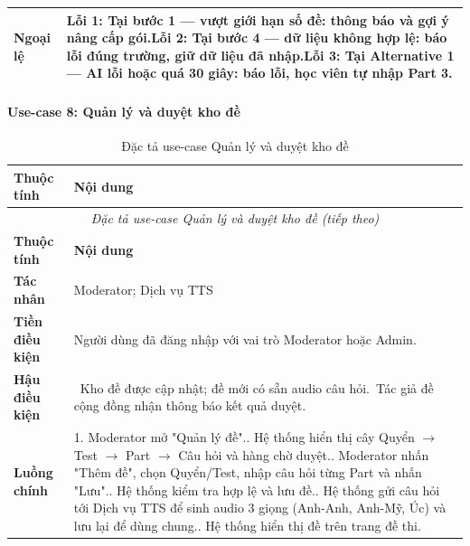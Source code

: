 \begin{longtable}{|p{3.2cm}|p{\dimexpr\linewidth-3.2cm-4\tabcolsep-3\arrayrulewidth\relax}|}
\textbf{Ngoại lệ} & \textbf{Lỗi 1:} Tại bước 1 --- vượt giới hạn số đề: thông báo và gợi ý nâng cấp gói.\newline \textbf{Lỗi 2:} Tại bước 4 --- dữ liệu không hợp lệ: báo lỗi đúng trường, giữ dữ liệu đã nhập.\newline \textbf{Lỗi 3:} Tại Alternative 1 --- AI lỗi hoặc quá 30 giây: báo lỗi, học viên tự nhập Part 3. \\ \hline
\end{longtable}
\endgroup


\paragraph{Use-case 8: Quản lý và duyệt kho đề}

\begingroup
\small
\renewcommand{\arraystretch}{1.15}
\begin{longtable}{|p{3.2cm}|p{\dimexpr\linewidth-3.2cm-4\tabcolsep-3\arrayrulewidth\relax}|}
\caption{Đặc tả use-case Quản lý và duyệt kho đề}\label{wispace:tab:wispace_uc08_moderate_tests}\\
\hline
\textbf{Thuộc tính} & \textbf{Nội dung} \\ \hline
\endfirsthead
\multicolumn{2}{c}{\textit{Đặc tả use-case Quản lý và duyệt kho đề (tiếp theo)}}\\
\hline
\textbf{Thuộc tính} & \textbf{Nội dung} \\ \hline
\endhead
\hline
\endfoot
\textbf{Tác nhân} & Moderator; Dịch vụ TTS \\ \hline
\textbf{Tiền điều kiện} & Người dùng đã đăng nhập với vai trò Moderator hoặc Admin. \\ \hline
\textbf{Hậu điều kiện} & \textbullet{}\ Kho đề được cập nhật; đề mới có sẵn audio câu hỏi.\newline \textbullet{}\ Tác giả đề cộng đồng nhận thông báo kết quả duyệt. \\ \hline
\textbf{Luồng chính} & 1. Moderator mở "Quản lý đề".\newline 2. Hệ thống hiển thị cây Quyển $\rightarrow$ Test $\rightarrow$ Part $\rightarrow$ Câu hỏi và hàng chờ duyệt.\newline 3. Moderator nhấn "Thêm đề", chọn Quyển/Test, nhập câu hỏi từng Part và nhấn "Lưu".\newline 4. Hệ thống kiểm tra hợp lệ và lưu đề.\newline 5. Hệ thống gửi câu hỏi tới Dịch vụ TTS để sinh audio 3 giọng (Anh-Anh, Anh-Mỹ, Úc) và lưu lại để dùng chung.\newline 6. Hệ thống hiển thị đề trên trang đề thi. \\ \hline

\end{longtable}
